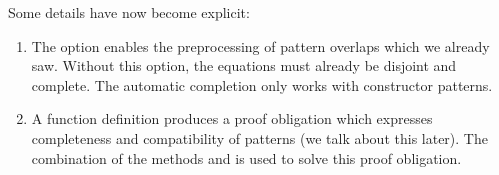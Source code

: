 \begin{isabellebody}
\begin{isamarkuptext}
  \vspace*{1em}
  \noindent Some details have now become explicit:

  \begin{enumerate}
  \item The  option enables the preprocessing of
  pattern overlaps which we already saw. Without this option, the equations
  must already be disjoint and complete. The automatic completion only
  works with constructor patterns.

  \item A function definition produces a proof obligation which
  expresses completeness and compatibility of patterns (we talk about
  this later). The combination of the methods  and
   is used to solve this proof obligation.


\end{enumerate}
\end{isamarkuptext}
\end{isabellebody}
